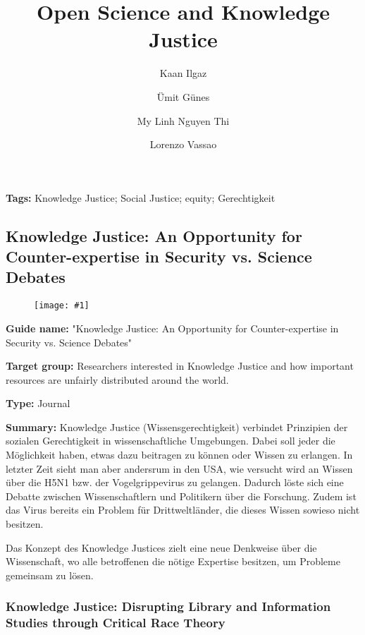 \documentclass{article}
\newlength{\imgwidth}
\newcommand\scaledgraphics[2]{%
                
\settowidth{\imgwidth}{\texttt{[image: \#1]}}%
                
\setlength{\imgwidth}{\minof{\imgwidth}{#2\textwidth}}%
                
\texttt{[image: \#1]}%
                
}
\begin{document}
\title{Open Science and Knowledge Justice}

\maketitle

\author{Kaan Ilgaz}
\author{Ümit Günes}
\author{My Linh Nguyen Thi}
\author{Lorenzo Vassao}
\affil{}





\textbf{Tags:} Knowledge Justice; Social Justice; equity; Gerechtigkeit


\subsection{Knowledge Justice: An Opportunity for Counter-expertise in Security vs. Science Debates}\label{H870315}


\begin{figure}
\scaledgraphics{086e7cc2-fafd-4cc2-8c8f-018ac3a9884d.png}{1}
\label{F24704971}
\end{figure}





\textbf{Guide name:} "Knowledge Justice: An Opportunity for Counter-expertise in Security vs. Science Debates" \autocite{r_egert_knowledge_2017}


\textbf{Target group: }Researchers interested in Knowledge Justice and how important resources are unfairly distributed around the world.


\textbf{Type:} Journal


\textbf{Summary: }Knowledge Justice (Wissensgerechtigkeit) verbindet Prinzipien der sozialen Gerechtigkeit in wissenschaftliche Umgebungen. Dabei soll jeder die Möglichkeit haben, etwas dazu beitragen zu können oder Wissen zu erlangen. In letzter Zeit sieht man aber andersrum in den USA, wie versucht wird an Wissen über die H5N1 bzw. der Vogelgrippevirus zu gelangen. Dadurch löste sich eine Debatte zwischen Wissenschaftlern und Politikern über die Forschung. Zudem ist das Virus bereits ein Problem für Drittweltländer, die dieses Wissen sowieso nicht besitzen.


Das Konzept des Knowledge Justices zielt eine neue Denkweise über die Wissenschaft, wo alle betroffenen die nötige Expertise besitzen, um Probleme gemeinsam zu lösen.


\subsubsection{Knowledge Justice: Disrupting Library and Information Studies through Critical Race Theory}\label{H8244312}
\end{document}
